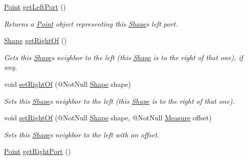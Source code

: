 \begin{DoxyCompactItemize}
\hyperlink{classcom_1_1aarrelaakso_1_1drawl_1_1_point}{Point} \hyperlink{classcom_1_1aarrelaakso_1_1drawl_1_1_shape_aeffa96786ca552adf46924ec77da9555}{get\+Left\+Port} ()
\begin{DoxyCompactList}\small\item\em Returns a \hyperlink{classcom_1_1aarrelaakso_1_1drawl_1_1_point}{Point} object representing this \hyperlink{classcom_1_1aarrelaakso_1_1drawl_1_1_shape}{Shape}\textquotesingle{}s left port. \end{DoxyCompactList}\item 
\hyperlink{classcom_1_1aarrelaakso_1_1drawl_1_1_shape}{Shape} \hyperlink{classcom_1_1aarrelaakso_1_1drawl_1_1_shape_a1ad573b06f341aa79f6a255a476ae6e4}{get\+Right\+Of} ()
\begin{DoxyCompactList}\small\item\em Gets this \hyperlink{classcom_1_1aarrelaakso_1_1drawl_1_1_shape}{Shape}\textquotesingle{}s neighbor to the left (this \hyperlink{classcom_1_1aarrelaakso_1_1drawl_1_1_shape}{Shape} is to the right of that one), if any. \end{DoxyCompactList}\item 
void \hyperlink{classcom_1_1aarrelaakso_1_1drawl_1_1_shape_ae658426065f0d35bd721cd94bc540209}{set\+Right\+Of} (@Not\+Null \hyperlink{classcom_1_1aarrelaakso_1_1drawl_1_1_shape}{Shape} shape)
\begin{DoxyCompactList}\small\item\em Sets this \hyperlink{classcom_1_1aarrelaakso_1_1drawl_1_1_shape}{Shape}\textquotesingle{}s neighbor to the left (this \hyperlink{classcom_1_1aarrelaakso_1_1drawl_1_1_shape}{Shape} is to the right of that one). \end{DoxyCompactList}\item 
void \hyperlink{classcom_1_1aarrelaakso_1_1drawl_1_1_shape_a6be6bb2859ccc4fd6e55e85aac5ec255}{set\+Right\+Of} (@Not\+Null \hyperlink{classcom_1_1aarrelaakso_1_1drawl_1_1_shape}{Shape} shape, @Not\+Null \hyperlink{classcom_1_1aarrelaakso_1_1drawl_1_1_measure}{Measure} offset)
\begin{DoxyCompactList}\small\item\em Sets this \hyperlink{classcom_1_1aarrelaakso_1_1drawl_1_1_shape}{Shape}\textquotesingle{}s neighbor to the left with an offset. \end{DoxyCompactList}\item 
\hyperlink{classcom_1_1aarrelaakso_1_1drawl_1_1_point}{Point} \hyperlink{classcom_1_1aarrelaakso_1_1drawl_1_1_shape_a319c78d425ec91e1aef1072a95e349ad}{get\+Right\+Port} ()

\end{DoxyCompactItemize}
